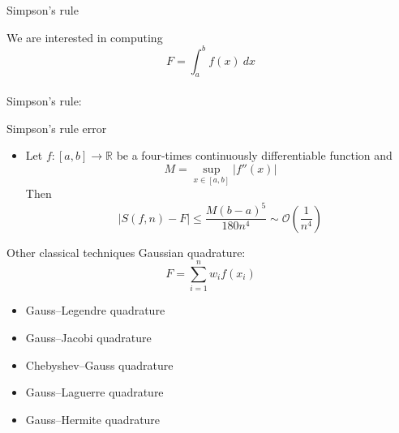 \documentclass{beamer}
\newcommand{\bitem}{\item[$\bullet$]}
\begin{document}
\begin{frame}{Simpson's rule}

We are interested in computing
$$
F=\int_a^b f(x)~dx
$$
~\\
Simpson's rule:

    
\end{frame}


\begin{frame}{Simpson's rule error}

\begin{itemize}
    \bitem Let $f:[a,b] \to \mathbb{R}$ be a four-times continuously differentiable function and 
    $$
    M = \sup_{x\in [a,b]} |f''(x)|
    $$
    Then
    $$
    |S(f,n) - F| \leq \frac{M (b-a)^5}{180 n^4} \sim \mathcal{O}\left( \frac{1}{n^4}\right)
    $$
\end{itemize}
    
\end{frame}

\begin{frame}{Other classical techniques}
Gaussian quadrature:
$$
F = \sum_{i=1}^n w_i f(x_i)
$$
\begin{itemize}
    \bitem Gauss–Legendre quadrature
    \bitem Gauss–Jacobi quadrature
    \bitem Chebyshev–Gauss quadrature
    \bitem Gauss–Laguerre quadrature
    \bitem Gauss–Hermite quadrature
\end{itemize}

\end{frame}
\end{document}
